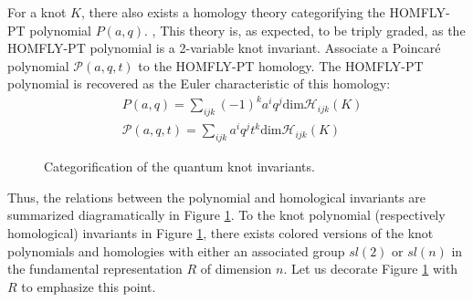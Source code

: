 \documentclass[a4paper,titlepage,twoside]{book}
\begin{document}
For a knot $K$, there also exists a homology theory categorifying the HOMFLY-PT polynomial $P{(a,q)}$. \cite{KhovanovRozansky2004}, \cite{KhovanovRozansky2005}   This theory is, as expected, to be triply graded, as the HOMFLY-PT polynomial is a 2-variable knot invariant.  Associate a Poincar\'{e} polynomial $\mathcal{P}{(a,q,t)}$ to the HOMFLY-PT homology.  The HOMFLY-PT polynomial is recovered as the Euler characteristic of this homology:
\begin{align}
  & P{(a,q)} = \sum_{ ijk} (-1)^k a^i q^j \text{dim}{ \mathcal{H}_{ijk}{(K) }} \\ 
  & \mathcal{P}{ (a,q,t)} = \sum_{ijk} a^i q^j t^k \text{dim}{ \mathcal{H}_{ijk}{(K)} }
\end{align}

\begin{figure}[h]
\begin{center}
\end{center}
\caption{Categorification of the quantum knot invariants.   } \label{Fig:CatcoloredsuperPoly00}
\end{figure}

Thus, the relations between the polynomial and homological invariants are summarized diagramatically in Figure \ref{Fig:CatcoloredsuperPoly00}.  To the knot polynomial (respectively homological) invariants in Figure \ref{Fig:CatcoloredsuperPoly00}, there exists colored versions of the knot polynomials and homologies with either an associated group $sl{(2)}$ or $sl{(n)}$ in the fundamental representation $R$ of dimension $n$.    Let us decorate Figure \ref{Fig:CatcoloredsuperPoly00} with $R$ to emphasize this point. 
\end{document}
